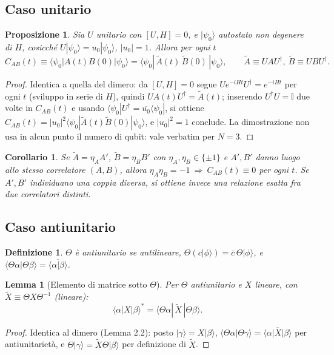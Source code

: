 \documentclass[11pt,a4paper]{article}
\newtheorem{lemma}{Lemma}
\newtheorem{proposizione}{Proposizione}
\newtheorem{corollario}{Corollario}
\newtheorem*{definizione}{Definizione}
\newcommand{\ket}[1]{\lvert #1 \rangle}
\begin{document}
\subsection{Caso unitario}

\begin{proposizione}
\label{prop:unitaria}
Sia $U$ unitario con $[U,H]=0$, e $|\psi_0\rangle$ autostato non degenere di $H$, cosicché
$U|\psi_0\rangle=u_0|\psi_0\rangle$, $|u_0|=1$. Allora per ogni $t$
\begin{equation}
C_{AB}(t) \equiv \langle\psi_0|A(t)B(0)|\psi_0\rangle
= \langle\psi_0|\,\widetilde A(t)\,\widetilde B(0)\,|\psi_0\rangle,
\qquad \widetilde A\equiv UAU^\dagger,\ \widetilde B\equiv UBU^\dagger.
\end{equation}
\end{proposizione}
\begin{proof}
Identica a quella del dimero: da $[U,H]=0$ segue $Ue^{-iHt}U^\dagger=e^{-iHt}$ per ogni $t$
(sviluppo in serie di $H$), quindi $UA(t)U^\dagger=\widetilde A(t)$; inserendo $U^\dagger U=\mathbb
I$ due volte in $C_{AB}(t)$ e usando $\langle\psi_0|U^\dagger=\overline{u_0}\langle\psi_0|$, si
ottiene $C_{AB}(t)=|u_0|^2\langle\psi_0|\widetilde A(t)\widetilde B(0)|\psi_0\rangle$, e
$|u_0|^2=1$ conclude. La dimostrazione non usa in alcun punto il numero di qubit: vale
verbatim per $N=3$.
\end{proof}

\begin{corollario}
\label{cor:zero-unitario}
Se $\widetilde A=\eta_A A'$, $\widetilde B=\eta_B B'$ con $\eta_A,\eta_B\in\{\pm1\}$ e $A',B'$
danno luogo allo stesso correlatore $(A,B)$, allora $\eta_A\eta_B=-1\ \Rightarrow\
C_{AB}(t)\equiv0$ per ogni $t$. Se $A',B'$ individuano una coppia \emph{diversa}, si ottiene
invece una relazione esatta fra due correlatori distinti.
\end{corollario}

\subsection{Caso antiunitario}

\begin{definizione}
$\Theta$ è antiunitario se antilineare, $\Theta(c\ket\phi)=\bar c\,\Theta\ket\phi$, e
$\langle\Theta\alpha|\Theta\beta\rangle=\overline{\langle\alpha|\beta\rangle}$.
\end{definizione}

\begin{lemma}[Elemento di matrice sotto $\Theta$]
\label{lem:matrix-element}
Per $\Theta$ antiunitario e $X$ lineare, con $\widetilde X\equiv\Theta X\Theta^{-1}$ (lineare):
$$\langle\alpha|X|\beta\rangle^{*} = \langle\Theta\alpha|\,\widetilde X\,|\Theta\beta\rangle.$$
\end{lemma}
\begin{proof}
Identica al dimero (Lemma 2.2): posto $\ket\gamma=X\ket\beta$,
$\langle\Theta\alpha|\Theta\gamma\rangle=\overline{\langle\alpha|X|\beta\rangle}$ per
antiunitarietà, e $\Theta\ket\gamma=\widetilde X\Theta\ket\beta$ per definizione di
$\widetilde X$.
\end{proof}
\end{document}
